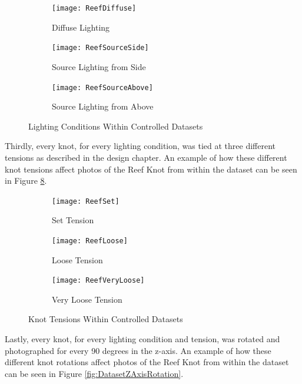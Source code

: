 \documentclass{l4proj}
\begin{document}
\begin{figure}[h]
	\begin{subfigure}{.3\textwidth}
		\centering
        \texttt{[image: ReefDiffuse]}
        \caption{Diffuse Lighting}
        \label{fig:DatasetLightDiffuse}
	\end{subfigure}
	\begin{subfigure}{.3\textwidth}
		\centering
        \texttt{[image: ReefSourceSide]}
        \caption{Source Lighting from Side}
        \label{fig:DatasetLightSide}
	\end{subfigure}
	\begin{subfigure}{.3\textwidth}
		\centering
        \texttt{[image: ReefSourceAbove]}
        \caption{Source Lighting from Above}
        \label{fig:DatasetLightAbove}
	\end{subfigure}
	\caption{Lighting Conditions Within Controlled Datasets}
    \label{fig:DatasetLighting}
\end{figure}

Thirdly, every knot, for every lighting condition, was tied at three different tensions as described in the design chapter.
An example of how these different knot tensions affect photos of the Reef Knot from within the dataset can be seen in Figure \ref{fig:DatasetTension}.

\begin{figure}[h]
	\begin{subfigure}{.3\textwidth}
		\centering
        \texttt{[image: ReefSet]}
        \caption{Set Tension}
        \label{fig:DatasetTensionSet}
	\end{subfigure}
	\begin{subfigure}{.3\textwidth}
		\centering
        \texttt{[image: ReefLoose]}
        \caption{Loose Tension}
        \label{fig:DatasetTensionLoose}
	\end{subfigure}
	\begin{subfigure}{.3\textwidth}
		\centering
        \texttt{[image: ReefVeryLoose]}
        \caption{Very Loose Tension}
        \label{fig:DatasetTensionVeryLoose}
	\end{subfigure}
	\caption{Knot Tensions Within Controlled Datasets}
    \label{fig:DatasetTension}
\end{figure}

Lastly, every knot, for every lighting condition and tension, was rotated and photographed for every 90 degrees in the z-axis.
An example of how these different knot rotations affect photos of the Reef Knot from within the dataset can be seen in Figure \ref{fig:DatasetZAxisRotation}.
\end{document}
